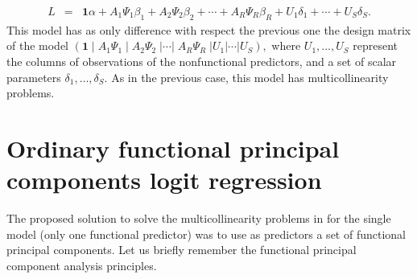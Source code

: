 \begin{eqnarray*}
L&=& \mathbf{1}\alpha + A_1 \Psi_1 \beta_1 + A_2 \Psi_2 \beta_2 + \cdots + A_R \Psi_R \beta_R+U_1 \delta_1+\cdots+U_S \delta_S.
\end{eqnarray*}
This model has as only difference with respect the previous one the design matrix of the model $\left( \mathbf{1}\;|\;A_1\Psi_1\;|\;A_2\Psi_2\;| \cdots |\;A_R\Psi_R \;| U_1 | \cdots | U_S \right), $ where $U_1,\ldots,U_S$ represent the columns of observations of the nonfunctional predictors, and a set of scalar parameters $\delta_1,\ldots,\delta_S.$ As in the previous case, this model has multicollinearity problems.



\section{Ordinary functional principal components logit regression}

The proposed solution to solve the multicollinearity problems in \cite{Escabias04} for the single model (only one functional predictor) was to use as predictors a set of functional principal components. Let us briefly remember the functional principal component analysis principles.

